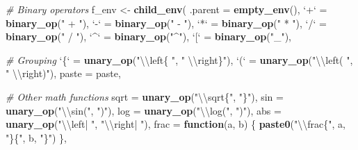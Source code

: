 \documentclass[]{book}
\newenvironment{Shaded}{\begin{snugshade}}{\end{snugshade}}
\newcommand{\CharTok}[1]{\textcolor[rgb]{0.5,0.5,0.5}{#1}}
\newcommand{\CommentTok}[1]{\textcolor[rgb]{0.37,0.37,0.37}{\textit{#1}}}
\newcommand{\ControlFlowTok}[1]{\textcolor[rgb]{0.27,0.27,0.27}{\textbf{#1}}}
\newcommand{\DataTypeTok}[1]{\textcolor[rgb]{0.27,0.27,0.27}{#1}}
\newcommand{\KeywordTok}[1]{\textcolor[rgb]{0.27,0.27,0.27}{\textbf{#1}}}
\newcommand{\NormalTok}[1]{#1}
\newcommand{\StringTok}[1]{\textcolor[rgb]{0.5,0.5,0.5}{#1}}
\begin{document}
\begin{Shaded}
\begin{Highlighting}[]
\CommentTok{# Binary operators}
\NormalTok{f_env <-}\StringTok{ }\KeywordTok{child_env}\NormalTok{(}
  \DataTypeTok{.parent =} \KeywordTok{empty_env}\NormalTok{(),}
  \StringTok{`}\DataTypeTok{+}\StringTok{`}\NormalTok{ =}\StringTok{ }\KeywordTok{binary_op}\NormalTok{(}\StringTok{" + "}\NormalTok{),}
  \StringTok{`}\DataTypeTok{-}\StringTok{`}\NormalTok{ =}\StringTok{ }\KeywordTok{binary_op}\NormalTok{(}\StringTok{" - "}\NormalTok{),}
  \StringTok{`}\DataTypeTok{*}\StringTok{`}\NormalTok{ =}\StringTok{ }\KeywordTok{binary_op}\NormalTok{(}\StringTok{" * "}\NormalTok{),}
  \StringTok{`}\DataTypeTok{/}\StringTok{`}\NormalTok{ =}\StringTok{ }\KeywordTok{binary_op}\NormalTok{(}\StringTok{" / "}\NormalTok{),}
  \StringTok{`}\DataTypeTok{^}\StringTok{`}\NormalTok{ =}\StringTok{ }\KeywordTok{binary_op}\NormalTok{(}\StringTok{"^"}\NormalTok{),}
  \StringTok{`}\DataTypeTok{[}\StringTok{`}\NormalTok{ =}\StringTok{ }\KeywordTok{binary_op}\NormalTok{(}\StringTok{"_"}\NormalTok{),}

  \CommentTok{# Grouping}
  \StringTok{`}\DataTypeTok{\{}\StringTok{`}\NormalTok{ =}\StringTok{ }\KeywordTok{unary_op}\NormalTok{(}\StringTok{"}\CharTok{\textbackslash{}\textbackslash{}}\StringTok{left\{ "}\NormalTok{, }\StringTok{" }\CharTok{\textbackslash{}\textbackslash{}}\StringTok{right\}"}\NormalTok{),}
  \StringTok{`}\DataTypeTok{(}\StringTok{`}\NormalTok{ =}\StringTok{ }\KeywordTok{unary_op}\NormalTok{(}\StringTok{"}\CharTok{\textbackslash{}\textbackslash{}}\StringTok{left( "}\NormalTok{, }\StringTok{" }\CharTok{\textbackslash{}\textbackslash{}}\StringTok{right)"}\NormalTok{),}
  \DataTypeTok{paste =}\NormalTok{ paste,}

  \CommentTok{# Other math functions}
  \DataTypeTok{sqrt =} \KeywordTok{unary_op}\NormalTok{(}\StringTok{"}\CharTok{\textbackslash{}\textbackslash{}}\StringTok{sqrt\{"}\NormalTok{, }\StringTok{"\}"}\NormalTok{),}
  \DataTypeTok{sin =}  \KeywordTok{unary_op}\NormalTok{(}\StringTok{"}\CharTok{\textbackslash{}\textbackslash{}}\StringTok{sin("}\NormalTok{, }\StringTok{")"}\NormalTok{),}
  \DataTypeTok{log =}  \KeywordTok{unary_op}\NormalTok{(}\StringTok{"}\CharTok{\textbackslash{}\textbackslash{}}\StringTok{log("}\NormalTok{, }\StringTok{")"}\NormalTok{),}
  \DataTypeTok{abs =}  \KeywordTok{unary_op}\NormalTok{(}\StringTok{"}\CharTok{\textbackslash{}\textbackslash{}}\StringTok{left| "}\NormalTok{, }\StringTok{"}\CharTok{\textbackslash{}\textbackslash{}}\StringTok{right| "}\NormalTok{),}
  \DataTypeTok{frac =} \ControlFlowTok{function}\NormalTok{(a, b) \{}
    \KeywordTok{paste0}\NormalTok{(}\StringTok{"}\CharTok{\textbackslash{}\textbackslash{}}\StringTok{frac\{"}\NormalTok{, a, }\StringTok{"\}\{"}\NormalTok{, b, }\StringTok{"\}"}\NormalTok{)}
\NormalTok{  \},}


\end{Highlighting}
\end{Shaded}
\end{document}
